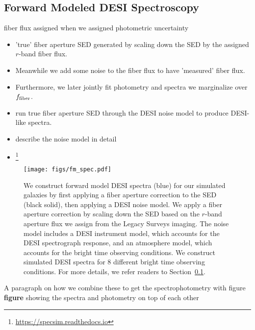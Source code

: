 \subsection{Forward Modeled DESI Spectroscopy} \label{sec:spec}
fiber flux assigned when we assigned photometric uncertainty

\begin{itemize} 
    \item 'true' fiber aperture SED generated by scaling down the SED by the 
    assigned $r$-band fiber flux. 
    \item Meanwhile we add some noise to the fiber flux to have
    'measured' fiber flux. 
    \item Furthermore, we later jointly fit photometry and spectra we marginalize over $f_{\rm fiber}$.
    \item run true fiber aperture SED through the DESI noise model to produce DESI-like spectra. 
    \item describe the noise model in detail 
    \item \footnote{\href{https://specsim.readthedocs.io/en/stable/guide.html}{https://specsim.readthedocs.io}}
\end{itemize}


\begin{figure}
\begin{center}
\texttt{[image: figs/fm\_spec.pdf]} 
\caption{We construct forward model DESI spectra (blue) for our simulated galaxies by first
applying a fiber aperture correction to the SED (black solid), then applying a DESI noise model. 
We apply a fiber aperture correction by scaling down the SED based on the $r$-band aperture
flux we assign from the Legacy Surveys imaging. The noise model includes a DESI instrument 
model, which accounts for the DESI spectrograph response, and an atmosphere model, which 
accounts for the bright time observing conditions. We construct simulated DESI spectra for 
8 different bright time observing conditions. For more details, we refer readers to Section~\ref{sec:spec}.
}
\label{fig:spec}
\end{center}
\end{figure}

A paragraph on how we combine these to get the spectrophotometry with figure 
{\bf figure} showing the spectra and photometry on top of each other 

